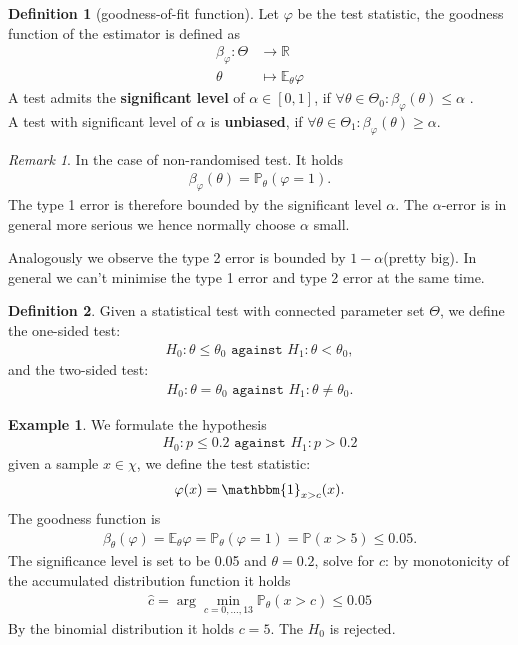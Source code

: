 \documentclass[a4paper,12pt, oneside, fleqn]{book}
\theoremstyle{definition}
\newtheorem{definition}{Definition}[section]
\newtheorem*{example}{Example}
\theoremstyle{remark}
\newtheorem*{remark}{Remark}
\begin{document}
\begin{definition}[goodness-of-fit function]
	Let $\varphi$ be the test statistic, the goodness function of the estimator is defined as 
	\begin{align*}
		\beta_\varphi: \Theta &\rightarrow \mathbb{R}\\
		\theta &\mapsto \mathbb{E}_\theta \varphi
	\end{align*}
	A test admits the \textbf{significant level} of $\alpha \in [0,1]$, if $ \forall \theta \in \Theta_0:  \beta_\varphi(\theta) \le \alpha$ . \\
	A test with significant level of $\alpha$ is \textbf{unbiased}, if $\forall \theta \in \Theta_1: \beta_\varphi(\theta) \ge \alpha$.  
\end{definition}
\begin{remark}
In the case of non-randomised test. It holds
\begin{align*}
	\beta_\varphi(\theta) = \mathbb{P}_\theta (\varphi = 1). 
\end{align*}	
The type 1 error is therefore bounded by the significant level $\alpha$.
The $\alpha$-error is in general more serious we hence normally choose $\alpha$ small. \par 
Analogously we observe the type 2 error is bounded by $1-\alpha$(pretty big). In general we can't minimise the type 1 error and type 2 error at the same time. 
\end{remark}

\begin{definition}
Given a statistical test with connected parameter set $\Theta$, we define the one-sided test:
\begin{align*}
	H_0: \theta \le \theta_0 \texttt{ against } H_1: \theta < \theta_0,
\end{align*}
and the two-sided test:
\begin{align*}
	H_0: \theta = \theta_0 \texttt{ against }  H_1: \theta \neq \theta_0.
\end{align*}
\end{definition}

\begin{example}


We formulate the hypothesis
\begin{align*}
	H_0: p \le 0.2 \texttt{ against } H_1: p > 0.2
\end{align*}
given a sample $x \in \chi$, we define the test statistic:
\begin{align*}
	\varphi(x) = \mathbbm{1}_{x > c}(x). 
\end{align*}	
The goodness function is 
\begin{align*}
	\beta_\theta(\varphi) = \mathbb{E}_\theta \varphi = \mathbb{P}_\theta(\varphi = 1) = \mathbb{P}(x >5) \le 0.05.
\end{align*}
The significance level is set to be 0.05 and $\theta = 0.2$, solve for $c$: by monotonicity of the accumulated distribution function it holds
\begin{align*}
	 \hat{c} = \arg\min_{c = 0, \dots, 13} \mathbb{P}_\theta (x >  c) \le 0.05 
\end{align*}
By the binomial distribution it holds $c = 5$. The $H_0$ is rejected.
\end{example}
\end{document}
